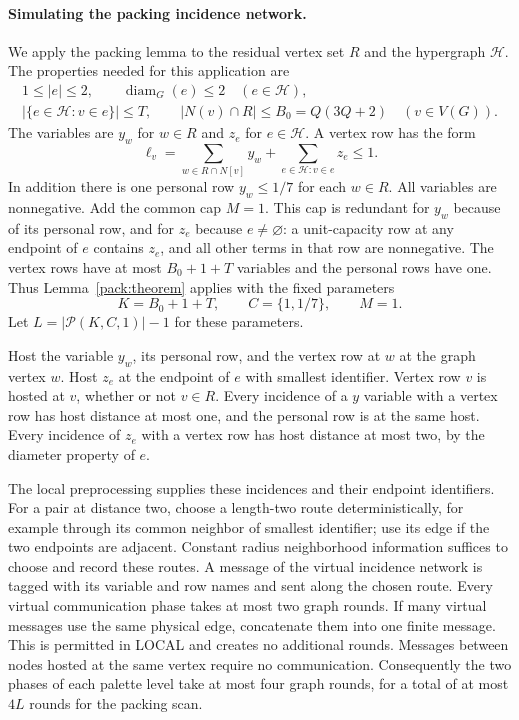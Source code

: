 \documentclass[11pt,a4paper]{article}
\theoremstyle{definition}
\theoremstyle{remark}
\begin{document}
\paragraph{Simulating the packing incidence network.}
We apply the packing lemma to the residual vertex set $R$ and the
hypergraph $\mathcal H$.  The properties needed for this application are
\[
 \begin{gathered}
 1\leq |e|\leq2,\qquad \operatorname{diam}_G(e)\leq2
       \quad(e\in\mathcal H),\\
 |\{e\in\mathcal H:v\in e\}|\leq T,\qquad
 |N(v)\cap R|\leq B_0=Q(3Q+2)\quad(v\in V(G)).
 \end{gathered}
\]
The variables are $y_w$ for $w\in R$ and $z_e$ for
$e\in\mathcal H$.  A vertex row has the form
\begin{equation}\label{pack:mixed-row}
 \ell_v=\sum_{w\in R\cap N[v]}y_w
             +\sum_{e\in\mathcal H:v\in e}z_e\leq1.
\end{equation}
In addition there is one personal row $y_w\leq1/7$ for each $w\in R$.
All variables are nonnegative.  Add the common cap $M=1$.
This cap is redundant for $y_w$ because of its personal row, and for
$z_e$ because $e\ne\varnothing$: a unit-capacity row at any endpoint
of $e$ contains $z_e$, and all other terms in that row are nonnegative.
The vertex rows have at most $B_0+1+T$ variables and the personal rows
have one.  Thus Lemma~\ref{pack:theorem} applies with the fixed parameters
\begin{equation}\label{pack:parameters}
 K=B_0+1+T,\qquad C=\{1,1/7\},\qquad M=1.
\end{equation}
Let $L=|\mathcal P(K,C,1)|-1$ for these parameters.

Host the variable $y_w$, its personal row, and the vertex row at $w$
at the graph vertex $w$.  Host $z_e$ at the endpoint of $e$ with
smallest identifier.  Vertex row $v$ is hosted at $v$, whether or not
$v\in R$.  Every incidence of a $y$ variable with a vertex row has
host distance at most one, and the personal row is at the same host.
Every incidence of $z_e$ with a vertex row has host distance at most
two, by the diameter property of $e$.

The local preprocessing supplies these incidences and their endpoint
identifiers.  For a pair at distance two, choose a length-two route
deterministically, for example through its common neighbor of smallest
identifier; use its edge if the two endpoints are adjacent.  Constant
radius neighborhood information suffices to choose and record these
routes.  A message of the virtual incidence network is tagged with its
variable and row names and sent along the chosen route.  Every virtual
communication phase takes at most two graph rounds.  If many virtual
messages use the same physical edge, concatenate them into one finite
message.  This is permitted in LOCAL and creates no additional rounds.
Messages between nodes hosted at the same vertex require no communication.
Consequently the two phases of each palette level take at most four
graph rounds, for a total of at most $4L$ rounds for the packing scan.
\end{document}
